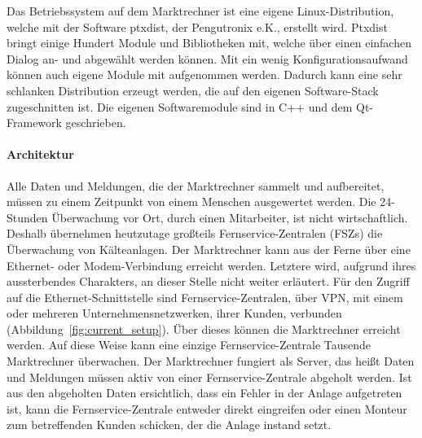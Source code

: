 \documentclass[11pt,a4paper]{report}
\begin{document}
Das Betriebssystem auf dem Marktrechner ist eine eigene Linux-Distribution, welche mit der Software ptxdist, der  Pengutronix e.K., erstellt wird. Ptxdist bringt einige Hundert Module und Bibliotheken mit, welche über einen einfachen Dialog an- und abgewählt werden können. Mit ein wenig Konfigurationsaufwand können auch eigene Module mit aufgenommen werden. Dadurch kann eine sehr schlanken Distribution erzeugt werden, die  auf den eigenen Software-Stack zugeschnitten ist. Die eigenen Softwaremodule sind in C++ und dem Qt-Framework geschrieben. 

\paragraph{Architektur}

Alle Daten und Meldungen, die der Marktrechner sammelt und aufbereitet, müssen zu einem Zeitpunkt von einem Menschen ausgewertet werden. Die 24-Stunden Überwachung vor Ort, durch einen Mitarbeiter, ist nicht wirtschaftlich. Deshalb übernehmen heutzutage großteils Fernservice-Zentralen (FSZs) die Überwachung von Kälteanlagen. Der Marktrechner kann aus der Ferne über eine Ethernet- oder Modem-Verbindung erreicht werden. Letztere wird, aufgrund ihres aussterbendes Charakters, an dieser Stelle nicht weiter erläutert. Für den Zugriff auf die Ethernet-Schnittstelle sind Fernservice-Zentralen, über VPN, mit einem oder mehreren Unternehmensnetzwerken, ihrer Kunden, verbunden (Abbildung~\ref{fig:current_setup}). Über dieses können die Marktrechner erreicht werden. Auf diese Weise kann eine einzige Fernservice-Zentrale Tausende Marktrechner überwachen. Der Marktrechner fungiert als Server, das heißt Daten und Meldungen müssen aktiv von einer Fernservice-Zentrale abgeholt werden. Ist aus den abgeholten Daten ersichtlich, dass ein Fehler in der Anlage aufgetreten ist, kann die Fernservice-Zentrale entweder direkt eingreifen oder einen Monteur zum betreffenden Kunden schicken, der die Anlage instand setzt.

\end{document}
